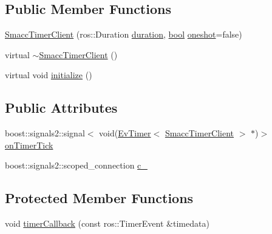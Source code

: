 \subsection*{Public Member Functions}
\begin{DoxyCompactItemize}
\item 
\hyperlink{classros__timer__client_1_1SmaccTimerClient_a1cdcbcbf8263680ebc38e475a04c5e4f}{Smacc\+Timer\+Client} (ros\+::\+Duration \hyperlink{classros__timer__client_1_1SmaccTimerClient_afa4e91d5da885c59306d74c7b6e85052}{duration}, \hyperlink{classbool}{bool} \hyperlink{classros__timer__client_1_1SmaccTimerClient_a34bff666381b2a35860a7cf9ab6427e9}{oneshot}=false)
\item 
virtual \hyperlink{classros__timer__client_1_1SmaccTimerClient_a15ee3829b6f6179e91ceb943644a2be6}{$\sim$\+Smacc\+Timer\+Client} ()
\item 
virtual void \hyperlink{classros__timer__client_1_1SmaccTimerClient_a23ca454fd2d9035bb5142c0b9261635a}{initialize} ()
\end{DoxyCompactItemize}
\subsection*{Public Attributes}
\begin{DoxyCompactItemize}
\item 
boost\+::signals2\+::signal$<$ void(\hyperlink{structros__timer__client_1_1EvTimer}{Ev\+Timer}$<$ \hyperlink{classros__timer__client_1_1SmaccTimerClient}{Smacc\+Timer\+Client} $>$ $\ast$)$>$ \hyperlink{classros__timer__client_1_1SmaccTimerClient_aa9219b9e3278fcbd3f8fbe82bfc7a33f}{on\+Timer\+Tick}
\item 
boost\+::signals2\+::scoped\+\_\+connection \hyperlink{classros__timer__client_1_1SmaccTimerClient_a71473af935673138cb1f93a16c8fe37f}{c\+\_\+}
\end{DoxyCompactItemize}
\subsection*{Protected Member Functions}
\begin{DoxyCompactItemize}
\item 
void \hyperlink{classros__timer__client_1_1SmaccTimerClient_ab6a461bedfad7a1842d27249008cae4d}{timer\+Callback} (const ros\+::\+Timer\+Event \&timedata)
\end{DoxyCompactItemize}
